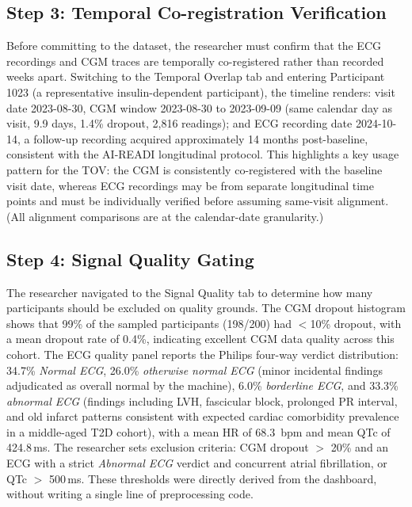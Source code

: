 \documentclass[conference]{IEEEtran}
\begin{document}
\subsection{Step 3: Temporal Co-registration Verification}
Before committing to the dataset, the researcher must confirm that the ECG recordings and CGM traces are temporally co-registered rather than recorded weeks apart. Switching to the Temporal Overlap tab and entering Participant 1023 (a representative insulin-dependent participant), the timeline renders: visit date 2023-08-30, CGM window 2023-08-30 to 2023-09-09 (same calendar day as visit, 9.9 days, 1.4\% dropout, 2,816 readings); and ECG recording date 2024-10-14, a follow-up recording acquired approximately
14 months post-baseline, consistent with the AI-READI longitudinal protocol. This highlights a key usage pattern for the TOV: the CGM is consistently co-registered with the baseline visit date, whereas ECG recordings may be from separate longitudinal time points and must be individually verified before assuming same-visit alignment. (All alignment comparisons are at the calendar-date granularity.) 

\subsection{Step 4: Signal Quality Gating}
The researcher navigated to the Signal Quality tab to determine how many participants should be excluded on quality grounds. The CGM dropout histogram shows that 99\% of the sampled participants (198/200) had $<$10\% dropout, with a mean dropout rate of 0.4\%, indicating excellent CGM data quality across this cohort. The ECG quality panel reports the Philips four-way verdict  distribution: 34.7\% \textit{Normal ECG}, 26.0\% \textit{otherwise normal ECG} 
(minor incidental findings adjudicated as overall normal by the machine), 6.0\% \textit{borderline ECG}, and 33.3\% \textit{abnormal ECG} (findings including LVH, fascicular block, prolonged PR interval, and old infarct patterns consistent with expected cardiac comorbidity prevalence in a middle-aged T2D cohort), with a mean HR of 68.3\, bpm and mean QTc of 424.8\,ms. 
The researcher sets exclusion criteria: CGM dropout $>$ 20\% and an ECG with a strict \textit{Abnormal ECG} verdict and concurrent atrial fibrillation, or QTc $>$ 500\,ms. These thresholds were directly derived from the dashboard, without writing a single line of preprocessing code.
\end{document}
